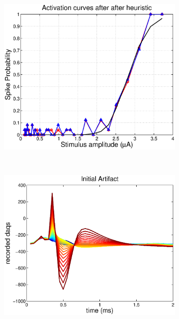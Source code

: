 \documentclass[12pt,letterpaper,fleqn]{article}
\begin{document}
\begin{figure}[ht!]
      ~  \begin{subfigure}[b]{0.32\textwidth}
                \includegraphics[width=\textwidth]{Act3.eps}
                \caption{}
        \end{subfigure}
        \\
         \begin{subfigure}[b]{0.32\textwidth}
                \includegraphics[width=\textwidth]{A0.eps}
                \caption{}
        \end{subfigure}     
       ~ \begin{subfigure}[b]{0.32\textwidth}

\end{subfigure}
\end{figure}
\end{document}
